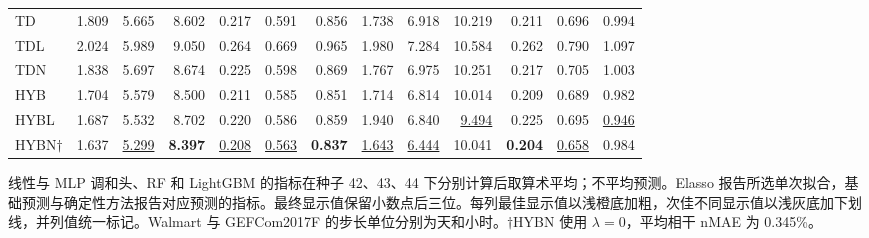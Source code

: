 \begin{table}[!htbp]
\begin{tabular*}{\textwidth}{@{\extracolsep{\fill}}l*{12}{r}@{}}
TD & 1.809 & 5.665 & 8.602 & 0.217 & 0.591 & 0.856 & 1.738 & 6.918 & 10.219 & 0.211 & 0.696 & 0.994 \\
TDL & 2.024 & 5.989 & 9.050 & 0.264 & 0.669 & 0.965 & 1.980 & 7.284 & 10.584 & 0.262 & 0.790 & 1.097 \\
TDN & 1.838 & 5.697 & 8.674 & 0.225 & 0.598 & 0.869 & 1.767 & 6.975 & 10.251 & 0.217 & 0.705 & 1.003 \\
HYB & 1.704 & 5.579 & 8.500 & 0.211 & 0.585 & 0.851 & 1.714 & 6.814 & 10.014 & 0.209 & 0.689 & 0.982 \\
HYBL & 1.687 & 5.532 & 8.702 & 0.220 & 0.586 & 0.859 & 1.940 & 6.840 & \cellcolor{accuracysecond}\underline{9.494} & 0.225 & 0.695 & \cellcolor{accuracysecond}\underline{0.946} \\
HYBN$\dagger$ & 1.637 & \cellcolor{accuracysecond}\underline{5.299} & \cellcolor{accuracybest}\textbf{8.397} & \cellcolor{accuracysecond}\underline{0.208} & \cellcolor{accuracysecond}\underline{0.563} & \cellcolor{accuracybest}\textbf{0.837} & \cellcolor{accuracysecond}\underline{1.643} & \cellcolor{accuracysecond}\underline{6.444} & 10.041 & \cellcolor{accuracybest}\textbf{0.204} & \cellcolor{accuracysecond}\underline{0.658} & 0.984 \\
\bottomrule
\end{tabular*}
\par\smallskip\begin{minipage}{\textwidth}\footnotesize 线性与 MLP 调和头、RF 和 LightGBM 的指标在种子 42、43、44 下分别计算后取算术平均；不平均预测。Elasso 报告所选单次拟合，基础预测与确定性方法报告对应预测的指标。最终显示值保留小数点后三位。每列最佳显示值以浅橙底加粗，次佳不同显示值以浅灰底加下划线，并列值统一标记。Walmart 与 GEFCom2017F 的步长单位分别为天和小时。$\dagger$HYBN 使用 $\lambda=0$，平均相干 nMAE 为 0.345\%。\end{minipage}
\endgroup
\end{table}
